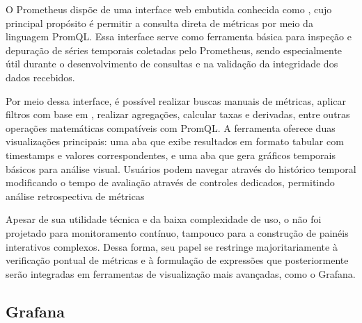 {\color{red}

O Prometheus dispõe de uma interface web embutida conhecida como  \citep{promexpbrwsr2025}, cujo principal propósito é permitir a consulta direta de métricas por meio da linguagem PromQL. Essa interface serve como ferramenta básica para inspeção e depuração de séries temporais coletadas pelo Prometheus, sendo especialmente útil durante o desenvolvimento de consultas e na validação da integridade dos dados recebidos.

Por meio dessa interface, é possível realizar buscas manuais de métricas, aplicar filtros com base em , realizar agregações, calcular taxas e derivadas, entre outras operações matemáticas compatíveis com PromQL. A ferramenta oferece duas visualizações principais: uma aba  que exibe resultados em formato tabular com timestamps e valores correspondentes, e uma aba  que gera gráficos temporais básicos para análise visual. Usuários podem navegar através do histórico temporal modificando o tempo de avaliação através de controles dedicados, permitindo análise retrospectiva de métricas

Apesar de sua utilidade técnica e da baixa complexidade de uso, o  não foi projetado para monitoramento contínuo, tampouco para a construção de painéis interativos complexos. Dessa forma, seu papel se restringe majoritariamente à verificação pontual de métricas e à formulação de expressões que posteriormente serão integradas em ferramentas de visualização mais avançadas, como o Grafana.

}

\subsection{Grafana}
\label{subsection:Grafana}

